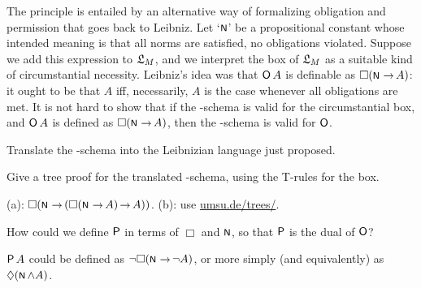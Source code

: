 The  principle is entailed by an alternative way of formalizing obligation
and permission that goes back to Leibniz. Let `$\OK$' be a propositional
constant whose intended meaning is that all norms are satisfied, no obligations
violated. Suppose we add this expression to $\mathfrak{L}_M$, and we interpret the box of
$\mathfrak{L}_M$ as a suitable kind of circumstantial necessity. Leibniz's idea was that
$\operatorname{\mathsf{O}} A$ is definable as $\Box (\OK \to A)$: it ought to be that $A$ iff,
necessarily, $A$ is the case whenever all obligations are met. It is not hard to
show that if the -schema is valid for the circumstantial box, and $\operatorname{\mathsf{O}} A$
is defined as $\Box(\OK \to A)$, then the -schema is valid for $\operatorname{\mathsf{O}}$.



\begin{exercise}
  \beginwithlist
  \begin{exlist}
    \item Translate the -schema into the Leibnizian language just
    proposed.
  \item Give a tree proof for the translated -schema, using the T-rules
    for the box. 
  \end{exlist}
\end{exercise}
\begin{solution}
  (a): $\Box(\OK \to (\Box(\OK \to A) \to A))$. (b): use 
  \href{https://www.umsu.de/trees/}{umsu.de/trees/}.
\end{solution}


\begin{exercise}
  How could we define $\operatorname{\mathsf{P}}$ in terms of $\Box$ and $\OK$, so that $\operatorname{\mathsf{P}}$ is the
  dual of $\operatorname{\mathsf{O}}$? 
\end{exercise}
\begin{solution}
  $\operatorname{\mathsf{P}} A$ could be defined as $\neg\Box(\OK \to \neg A)$, or more simply (and
  equivalently) as $\Diamond (\OK \land A)$.
\end{solution}



